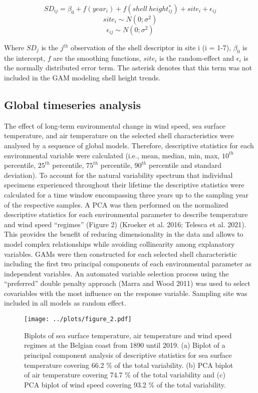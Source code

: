 \documentclass[smallextended]{svjour3}       %
\begin{document}
\[
SD_{ij} = \beta_0 + f(year_i) + f(shell\:height_{ij}^*) + site_i + \epsilon_{ij}
\] \[
site_i \sim N(0; \sigma^2)
\] \[
\epsilon_{ij} \sim N(0; \sigma^2)
\]

Where \(SD_j\) is the \(j^{th}\) observation of the shell descriptor in
site i (i = 1-7), \(\beta_0\) is the intercept, \(f\) are the smoothing
functions, \(site_i\) is the random-effect and \(\epsilon_i\) is the
normally distributed error term. The asterisk denotes that this term was
not included in the GAM modeling shell height trends.

\hypertarget{global-timeseries-analysis}{%
\subsection{Global timeseries
analysis}\label{global-timeseries-analysis}}

The effect of long-term environmental change in wind speed, sea surface
temperature, and air temperature on the selected shell characteristics
were analysed by a sequence of global models. Therefore, descriptive
statistics for each environmental variable were calculated (i.e., mean,
median, min, max, \(10^{th}\) percentile, \(25^{th}\) percentile,
\(75^{th}\) percentile, \(90^{th}\) percentile and standard deviation).
To account for the natural variability spectrum that individual
specimens experienced throughout their lifetime the descriptive
statistics were calculated for a time window encompassing three years up
to the sampling year of the respective samples. A PCA was then performed
on the normalized descriptive statistics for each environmental
parameter to describe temperature and wind speed ``regimes'' (Figure 2)
(Kroeker et al. 2016; Telesca et al. 2021). This provides the benefit of
reducing dimensionality in the data and allows to model complex
relationships while avoiding collinearity among explanatory variables.
GAMs were then constructed for each selected shell characteristic
including the first two principal components of each environmental
parameter as independent variables. An automated variable selection
process using the ``preferred'' double penalty approach (Marra and Wood
2011) was used to select covariables with the most influence on the
response variable. Sampling site was included in all models as random
effect.

\begin{figure}
\centering
\texttt{[image: ../plots/figure\_2.pdf]}
\caption{Biplots of sea surface temperature, air temperature and wind
speed regimes at the Belgian coast from 1890 until 2019. (a) Biplot of a
principal component analysis of descriptive statistics for sea surface
temperature covering 66.2 \% of the total variability. (b) PCA biplot of
air temperature covering 74.7 \% of the total variability and (c) PCA
biplot of wind speed covering 93.2 \% of the total variability.}
\end{figure}
\end{document}
